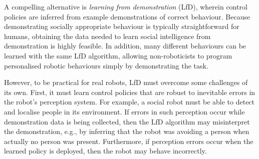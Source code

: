 \documentclass[letterpaper, 10 pt, conference]{ieeeconf}
\begin{document}

A compelling alternative is \emph{learning from demonstration} (LfD), wherein control policies are inferred from example demonstrations of correct behaviour.  Because demonstrating socially appropriate behaviour is typically straightforward for humans, obtaining the data needed to learn social intelligence from demonstration is highly feasible. In addition, many different behaviours can be learned with the same LfD algorithm, allowing non-roboticists to program personalised robotic behaviours simply by demonstrating the task.%


However, to be practical for real robots, LfD must overcome some challenges of its own.  First, it must learn control policies that are robust to inevitable errors in the robot's perception system.  For example, a social robot must be able to detect and localise people in its environment.  If errors in such perception occur while demonstration data is being collected, then the LfD algorithm may misinterpret the demonstration, e.g., by inferring that the robot was avoiding a person when actually no person was present.  Furthermore, if perception errors occur when the learned policy is deployed, then the robot may behave incorrectly.
\end{document}
